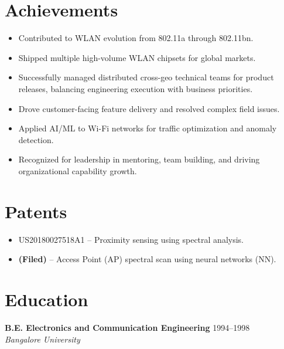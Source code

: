 \documentclass[a4paper,11pt]{article}
\begin{document}
\section*{Achievements}
\begin{itemize}
    \item Contributed to WLAN evolution from 802.11a through 802.11bn.
    \item Shipped multiple high-volume WLAN chipsets for global markets.
    \item Successfully managed distributed cross-geo technical teams for product releases, balancing engineering execution with business priorities.
    \item Drove customer-facing feature delivery and resolved complex field issues.
    \item Applied AI/ML to Wi-Fi networks for traffic optimization and anomaly detection.
    \item Recognized for leadership in mentoring, team building, and driving organizational capability growth.
\end{itemize}



\section*{Patents}
\begin{itemize}
    \item \textsc{US20180027518A1} -- Proximity sensing using spectral analysis.
    \item \textbf{(Filed)} -- Access Point (AP) spectral scan using neural networks (NN).
\end{itemize}



\section*{Education}
\textbf{B.E. Electronics and Communication Engineering} \hfill 1994--1998 \\
\textit{Bangalore University}

\pagestyle{fancy}
\fancyfoot[C]{\today} %
\end{document}
